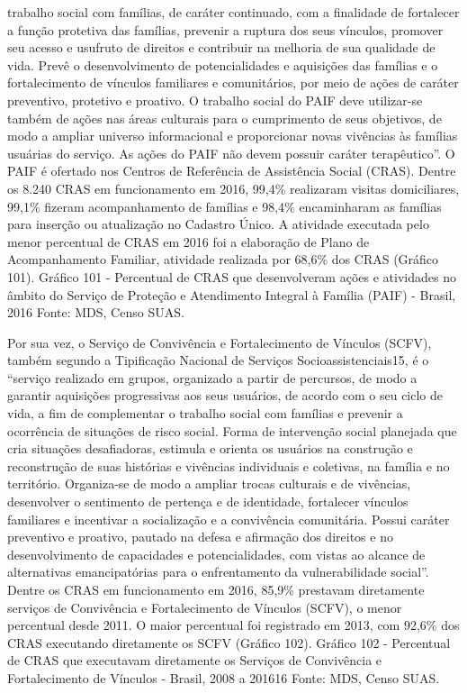 \documentclass[
  brazilian]{report}
\begin{document}
trabalho social com famílias, de caráter continuado, com a finalidade de
fortalecer a função protetiva das famílias, prevenir a ruptura dos seus
vínculos, promover seu acesso e usufruto de direitos e contribuir na
melhoria de sua qualidade de vida. Prevê o desenvolvimento de
potencialidades e aquisições das famílias e o fortalecimento de vínculos
familiares e comunitários, por meio de ações de caráter preventivo,
protetivo e proativo. O trabalho social do PAIF deve utilizar-se também
de ações nas áreas culturais para o cumprimento de seus objetivos, de
modo a ampliar universo informacional e proporcionar novas vivências às
famílias usuárias do serviço. As ações do PAIF não devem possuir caráter
terapêutico''. O PAIF é ofertado nos Centros de Referência de
Assistência Social (CRAS). Dentre os 8.240 CRAS em funcionamento em
2016, 99,4\% realizaram visitas domiciliares, 99,1\% fizeram
acompanhamento de famílias e 98,4\% encaminharam as famílias para
inserção ou atualização no Cadastro Único. A atividade executada pelo
menor percentual de CRAS em 2016 foi a elaboração de Plano de
Acompanhamento Familiar, atividade realizada por 68,6\% dos CRAS
(Gráfico 101). Gráfico 101 - Percentual de CRAS que desenvolveram ações
e atividades no âmbito do Serviço de Proteção e Atendimento Integral à
Família (PAIF) - Brasil, 2016 Fonte: MDS, Censo SUAS.

Por sua vez, o Serviço de Convivência e Fortalecimento de Vínculos
(SCFV), também segundo a Tipificação Nacional de Serviços
Socioassistenciais15, é o ``serviço realizado em grupos, organizado a
partir de percursos, de modo a garantir aquisições progressivas aos seus
usuários, de acordo com o seu ciclo de vida, a fim de complementar o
trabalho social com famílias e prevenir a ocorrência de situações de
risco social. Forma de intervenção social planejada que cria situações
desafiadoras, estimula e orienta os usuários na construção e
reconstrução de suas histórias e vivências individuais e coletivas, na
família e no território. Organiza-se de modo a ampliar trocas culturais
e de vivências, desenvolver o sentimento de pertença e de identidade,
fortalecer vínculos familiares e incentivar a socialização e a
convivência comunitária. Possui caráter preventivo e proativo, pautado
na defesa e afirmação dos direitos e no desenvolvimento de capacidades e
potencialidades, com vistas ao alcance de alternativas emancipatórias
para o enfrentamento da vulnerabilidade social''. Dentre os CRAS em
funcionamento em 2016, 85,9\% prestavam diretamente serviços de
Convivência e Fortalecimento de Vínculos (SCFV), o menor percentual
desde 2011. O maior percentual foi registrado em 2013, com 92,6\% dos
CRAS executando diretamente os SCFV (Gráfico 102). Gráfico 102 -
Percentual de CRAS que executavam diretamente os Serviços de Convivência
e Fortalecimento de Vínculos - Brasil, 2008 a 201616 Fonte: MDS, Censo
SUAS.
\end{document}
